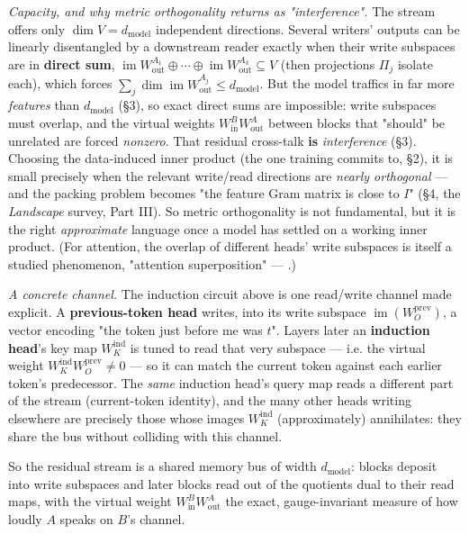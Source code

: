 \emph{Capacity, and why metric orthogonality returns as "interference".} The stream offers only $\dim V = d_{\text{model}}$ independent directions. Several writers' outputs can be linearly disentangled by a downstream reader exactly when their write subspaces are in \textbf{direct sum}, $\operatorname{im}W_{\text{out}}^{A_1}\oplus\cdots\oplus\operatorname{im}W_{\text{out}}^{A_k}\subseteq V$ (then projections $\Pi_j$ isolate each), which forces $\sum_j \dim\operatorname{im}W_{\text{out}}^{A_j} \le d_{\text{model}}$. But the model traffics in far more \emph{features} than $d_{\text{model}}$ (§3), so exact direct sums are impossible: write subspaces must overlap, and the virtual weights $W_{\text{in}}^B W_{\text{out}}^A$ between blocks that "should" be unrelated are forced \emph{nonzero}. That residual cross-talk \textbf{is} \emph{interference} (§3). Choosing the data-induced inner product (the one training commits to, §2), it is small precisely when the relevant write/read directions are \emph{nearly orthogonal} --- and the packing problem becomes "the feature Gram matrix is close to $I$" (§4, the \emph{Landscape} survey, Part III). So metric orthogonality is not fundamental, but it is the right \emph{approximate} language once a model has settled on a working inner product. (For attention, the overlap of different heads' write subspaces is itself a studied phenomenon, "attention superposition" --- \textcite{progress-on-attention}.)


\emph{A concrete channel.} The induction circuit above is one read/write channel made explicit. A \textbf{previous-token head} writes, into its write subspace $\operatorname{im}(W_O^{\text{prev}})$, a vector encoding "the token just before me was $t$". Layers later an \textbf{induction head}'s key map $W_K^{\text{ind}}$ is tuned to read that very subspace --- i.e. the virtual weight $W_K^{\text{ind}}W_O^{\text{prev}} \neq 0$ --- so it can match the current token against each earlier token's predecessor. The \emph{same} induction head's query map reads a different part of the stream (current-token identity), and the many other heads writing elsewhere are precisely those whose images $W_K^{\text{ind}}$ (approximately) annihilates: they share the bus without colliding with this channel.


So the residual stream is a shared memory bus of width $d_{\text{model}}$: blocks deposit into write subspaces and later blocks read out of the quotients dual to their read maps, with the virtual weight $W_{\text{in}}^B W_{\text{out}}^A$ the exact, gauge-invariant measure of how loudly $A$ speaks on $B$'s channel.


